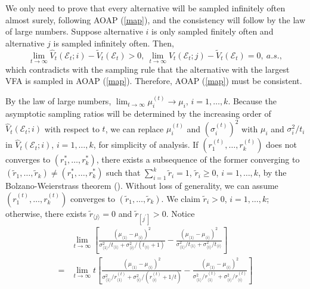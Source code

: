 \documentclass[journal]{IEEEtran}
\begin{document}
\begin{IEEEproof} We only need to prove that every alternative will be sampled infinitely often almost surely, following  AOAP (\ref{map}), and the consistency will follow by the law of large numbers. 
   Suppose alternative $i$ is only sampled finitely often and alternative $j$ is sampled infinitely often. Then, 
   $$\lim_{t\to\infty} \widehat{V}_t(\mathcal{E}_t;i)-\widetilde{V}_t(\mathcal{E}_t)>0,~ \lim_{t\to\infty} \widehat{V}_t(\mathcal{E}_t;j)-\widetilde{V}_t(\mathcal{E}_t)=0,~ a.s.,$$ 
   which contradicts with the sampling rule that the alternative with the largest VFA is sampled in AOAP (\ref{map}). Therefore, AOAP (\ref{map}) must be consistent. 
   
   By the law of large numbers, $\lim_{t\to\infty}\mu_{i}^{(t)}\to\mu_i$, $i=1,\ldots,k$.
    Because the asymptotic sampling ratios will be determined by the increasing order of $\widehat{V}_t(\mathcal{E}_t;i)$ with respect to $t$, we can replace $\mu_i^{(t)}$ and $(\sigma_i^{(t)})^2$ with $\mu_i$ and $\sigma_i^{2}/t_i$ in $\widehat{V}_t(\mathcal{E}_t;i)$, $i=1,\ldots,k$, for simplicity of analysis. If $(r_1^{(t)},\ldots,r_k^{(t)})$ does not converges to $(r_1^{*},\ldots,r_k^{*})$, there exists a subsequence of the former converging to $(\widetilde{r}_1,\ldots,\widetilde{r}_k)\neq (r_1^{*},\ldots,r_k^{*})$ such that  $\sum_{i=1}^{k} \widetilde{r}_i=1$, $\widetilde{r}_i\geq 0$, $i=1,\ldots,k$,  by the Bolzano-Weierstrass theorem (\cite{rudin1964principles}). Without loss of generality, we can assume $(r_1^{(t)},\ldots,r_k^{(t)})$ converges to $(\widetilde{r}_1,\ldots,\widetilde{r}_k)$. 
    We claim $\widetilde{r}_i>0$, $i=1,\ldots,k$; otherwise, there exists $\widetilde{r}_{\langle j\rangle}=0$ and  $\widetilde{r}_{[j^{'}]}>0$. Notice
    \begin{align*}
    &\lim_{t\to\infty}\left[\frac{\left(\mu_{\langle 1 \rangle}-\mu_{\langle i \rangle}\right)^2}{\sigma_{\langle 1 \rangle}^2/t_{\langle 1 \rangle}+\sigma_{\langle i \rangle}^2/(t_{\langle i \rangle}+1)}-\frac{\left(\mu_{\langle 1 \rangle}-\mu_{\langle i \rangle}\right)^2}{\sigma_{\langle 1 \rangle}^2/t_{\langle 1 \rangle}+\sigma_{\langle i \rangle}^2/t_{\langle i \rangle}}\right]\\
    =&\lim_{t\to\infty}t\left[\frac{\left(\mu_{\langle 1 \rangle}-\mu_{\langle i \rangle}\right)^2}{\sigma_{\langle 1 \rangle}^2/r^{(t)}_{\langle 1 \rangle}+\sigma_{\langle i \rangle}^2/(r^{(t)}_{\langle i \rangle}+1/t)}-\frac{\left(\mu_{\langle 1 \rangle}-\mu_{\langle i \rangle}\right)^2}{\sigma_{\langle 1 \rangle}^2/r^{(t)}_{\langle 1 \rangle}+\sigma_{\langle i \rangle}^2/r^{(t)}_{\langle i \rangle}}\right]\\

\end{align*}
\end{IEEEproof}
\end{document}
